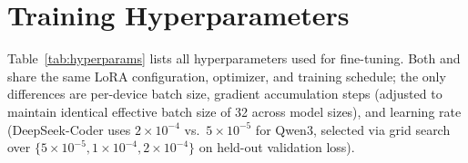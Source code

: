 \section{Training Hyperparameters}
\label{app:hyperparams}

Table~\ref{tab:hyperparams} lists all hyperparameters used for fine-tuning. Both \cls{} and \cwm{} share the same LoRA configuration, optimizer, and training schedule; the only differences are per-device batch size, gradient accumulation steps (adjusted to maintain identical effective batch size of 32 across model sizes), and learning rate (DeepSeek-Coder uses $2{\times}10^{-4}$ vs.\ $5{\times}10^{-5}$ for Qwen3, selected via grid search over $\{5{\times}10^{-5}, 1{\times}10^{-4}, 2{\times}10^{-4}\}$ on held-out validation loss).

\begin{table}[h]
\centering
\small
\caption{Training hyperparameters for \cls{}/\cwm{} configurations. \traj{} models use lr $= 2{\times}10^{-4}$ due to the smaller training set (${\sim}$8K function-level instances vs.\ ${\sim}$70K for \cls{}/\cwm{}); other hyperparameters are shared.}
\label{tab:hyperparams}

\vspace{6pt}


\end{table}
